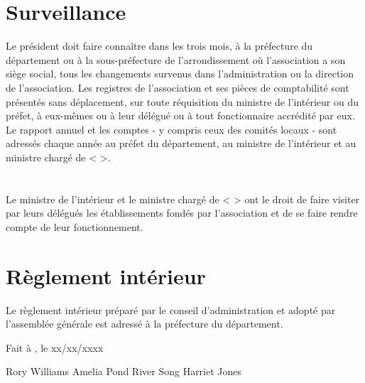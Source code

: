 \documentclass[a4paper,defaultorg]{organisation-contract}
\begin{document}
\section{Surveillance}
Le président doit faire connaître dans les trois mois, à la préfecture du
département ou à la sous-préfecture de l'arrondissement où l'association a son
siège social, tous les changements survenus dans l'administration ou la
direction de l'association.  Les registres de l'association et ses pièces de
comptabilité sont présentés sans déplacement, sur toute réquisition du ministre
de l'intérieur ou du préfet, à eux-mêmes ou à leur délégué ou à tout
fonctionnaire accrédité par eux.  Le rapport annuel et les comptes - y compris
ceux des comités locaux - sont adressés chaque année au préfet du département,
au ministre de l'intérieur et au ministre chargé de < >.


\section{}
Le ministre de l'intérieur et le ministre chargé de < > ont le droit de faire
visiter par leurs délégués les établissements fondés par l'association et de se
faire rendre compte de leur fonctionnement.

\section{Règlement intérieur}
Le règlement intérieur préparé par le conseil d'administration et adopté par
l'assemblée générale est adressé à la préfecture du département. 

\vspace{4cm}

Fait à , le xx/xx/xxxx

    Rory Williams\hfill
    Amelia Pond\hfill
    River Song\hfill
    Harriet Jones
\end{document}
